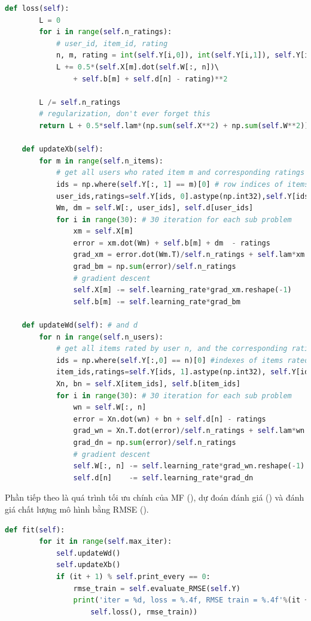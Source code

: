 \begin{lstlisting}[language=Python]
    def loss(self):
        L = 0 
        for i in range(self.n_ratings):
            # user_id, item_id, rating
            n, m, rating = int(self.Y[i,0]), int(self.Y[i,1]), self.Y[i,2]
            L += 0.5*(self.X[m].dot(self.W[:, n])\ 
                + self.b[m] + self.d[n] - rating)**2    
        
        L /= self.n_ratings
        # regularization, don't ever forget this 
        return L + 0.5*self.lam*(np.sum(self.X**2) + np.sum(self.W**2))

    def updateXb(self):
        for m in range(self.n_items):
            # get all users who rated item m and corresponding ratings
            ids = np.where(self.Y[:, 1] == m)[0] # row indices of items m 
            user_ids,ratings=self.Y[ids, 0].astype(np.int32),self.Y[ids, 2]
            Wm, dm = self.W[:, user_ids], self.d[user_ids]
            for i in range(30): # 30 iteration for each sub problem 
                xm = self.X[m]
                error = xm.dot(Wm) + self.b[m] + dm  - ratings 
                grad_xm = error.dot(Wm.T)/self.n_ratings + self.lam*xm
                grad_bm = np.sum(error)/self.n_ratings
                # gradient descent
                self.X[m] -= self.learning_rate*grad_xm.reshape(-1)
                self.b[m] -= self.learning_rate*grad_bm
    
    def updateWd(self): # and d 
        for n in range(self.n_users):
            # get all items rated by user n, and the corresponding ratings
            ids = np.where(self.Y[:,0] == n)[0] #indexes of items rated by n 
            item_ids,ratings=self.Y[ids, 1].astype(np.int32), self.Y[ids, 2]
            Xn, bn = self.X[item_ids], self.b[item_ids]
            for i in range(30): # 30 iteration for each sub problem 
                wn = self.W[:, n]
                error = Xn.dot(wn) + bn + self.d[n] - ratings
                grad_wn = Xn.T.dot(error)/self.n_ratings + self.lam*wn
                grad_dn = np.sum(error)/self.n_ratings
                # gradient descent
                self.W[:, n] -= self.learning_rate*grad_wn.reshape(-1)
                self.d[n]    -= self.learning_rate*grad_dn
\end{lstlisting} 
Phần tiếp theo là quá trình tối ưu chính của MF (), dự đoán
đánh giá (\pythoninline{pred}) và
đánh giá chất lượng mô hình bằng RMSE (). 
\begin{lstlisting}[language=Python]
    def fit(self):
        for it in range(self.max_iter):
            self.updateWd()
            self.updateXb()
            if (it + 1) % self.print_every == 0:
                rmse_train = self.evaluate_RMSE(self.Y)
                print('iter = %d, loss = %.4f, RMSE train = %.4f'%(it + 1, 
                    self.loss(), rmse_train))
\end{lstlisting} 
